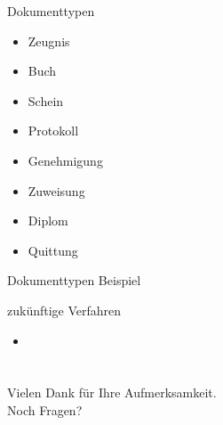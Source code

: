 \documentclass[12pt]{beamer}
\begin{document}
\begin{large}
\begin{frame}{Dokumenttypen}
 \begin{itemize}
  \item Zeugnis
  \item Buch
  \item Schein
  \item Protokoll
  \item Genehmigung
  \item Zuweisung
  \item Diplom
  \item Quittung
 \end{itemize}
\end{frame}

\begin{frame}{Dokumenttypen Beispiel}

\end{frame}


\begin{frame}{zukünftige Verfahren}
 \begin{itemize}
   \item 
 \end{itemize}
\end{frame}


\section*{}
\begin{frame}
\centering
{\Large Vielen Dank für Ihre Aufmerksamkeit. \\ Noch Fragen?}
\end{frame}

\end{large}
\end{document}
